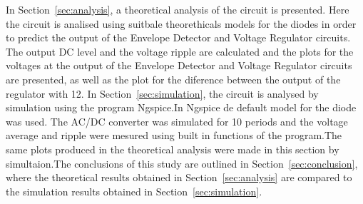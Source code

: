 In Section~\ref{sec:analysis}, a theoretical analysis of the circuit is
presented. Here the circuit is analised using suitbale theorethicals models for the diodes in order to predict the output of the Envelope Detector
and Voltage Regulator circuits. The output DC level and the
voltage ripple are calculated and the plots for the voltages at the output of the Envelope Detector and Voltage Regulator circuits are presented, as well as the plot for the diference between the output of the regulator with 12. 
In Section~\ref{sec:simulation}, the circuit is analysed by
simulation using the program Ngspice.In Ngspice de default model for the diode was used. The AC/DC converter was simulated for 10 periods and the voltage average and ripple were mesured using built in functions of the program.The same plots produced in the theoretical analysis were made in this section by simultaion.The conclusions of this study are outlined in
Section~\ref{sec:conclusion}, where the theoretical results obtained in
Section~\ref{sec:analysis} are compared to the simulation results obtained in
Section~\ref{sec:simulation}.





\pagebreak

